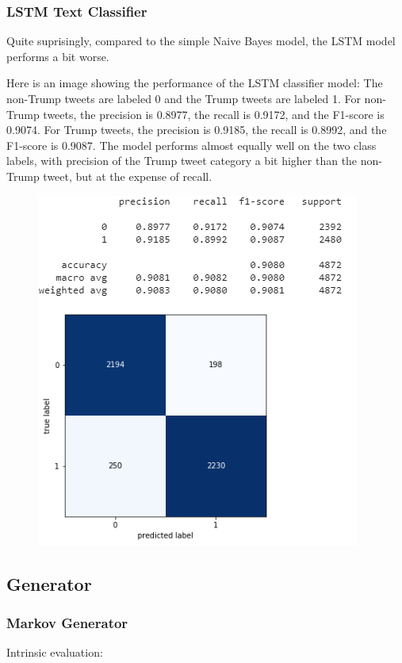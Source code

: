 \documentclass{article}
\begin{document}
\subsubsection{LSTM Text Classifier}
Quite suprisingly, compared to the simple Naive Bayes model, the LSTM model performs a bit worse.

Here is an image showing the performance of the LSTM classifier model: The non-Trump tweets are labeled 0 and the Trump tweets are labeled 1. For non-Trump tweets, the precision is 0.8977, the recall is 0.9172, and the F1-score is 0.9074. For Trump tweets, the precision is 0.9185, the recall is 0.8992, and the F1-score is 0.9087. The model performs almost equally well on the two class labels, with precision of the Trump tweet category a bit higher than the non-Trump tweet, but at the expense of recall.

\begin{figure}
\centering
\includegraphics{img/CLF_LSTM.PNG}
\end{figure}

\subsection{Generator}
\subsubsection{Markov Generator}
Intrinsic evaluation: 
\end{document}
